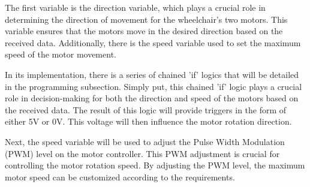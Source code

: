 The first variable is the direction variable, which plays a crucial role in determining the direction of movement for the wheelchair's two motors. This variable ensures that the motors move in the desired direction based on the received data. Additionally, there is the speed variable used to set the maximum speed of the motor movement.

In its implementation, there is a series of chained 'if' logics that will be detailed in the programming subsection. Simply put, this chained 'if' logic plays a crucial role in decision-making for both the direction and speed of the motors based on the received data. The result of this logic will provide triggers in the form of either 5V or 0V. This voltage will then influence the motor rotation direction.

Next, the speed variable will be used to adjust the Pulse Width Modulation (PWM) level on the motor controller. This PWM adjustment is crucial for controlling the motor rotation speed. By adjusting the PWM level, the maximum motor speed can be customized according to the requirements.



